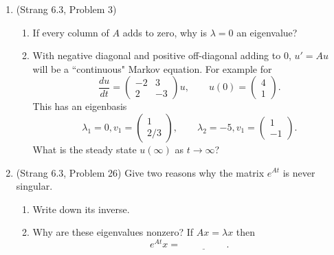 \documentclass[11pt]{article}
\begin{document}
\begin{enumerate}
\item (Strang 6.3, Problem 3)
\begin{enumerate}
\item If every column of $A$ adds to zero, why is $\lambda = 0$ an eigenvalue?
\item With negative diagonal and positive off-diagonal adding to $0$, $u' = Au$ will be a ``continuous" Markov equation.  For example for
\[\frac{du}{dt} = \begin{pmatrix} -2 & 3 \\ 2 & -3 \end{pmatrix} u, \qquad u(0) = \begin{pmatrix} 4 \\ 1 \end{pmatrix}.\]
This has an eigenbasis
\[\lambda_1 = 0, v_1 = \begin{pmatrix} 1 \\ 2/3 \end{pmatrix}, \qquad \lambda_2 = -5, v_1 = \begin{pmatrix} 1 \\ -1 \end{pmatrix}.\]
What is the steady state $u(\infty)$ as $t \to \infty$?
\end{enumerate}

\item (Strang 6.3, Problem 26) Give two reasons why the matrix $e^{At}$ is never singular.
\begin{enumerate}
\item Write down its inverse.
\item Why are these eigenvalues nonzero?  If $Ax = \lambda x$ then 
\[e^{At} x = \underline{\phantom{aaaaaaaaa}}. \]
\end{enumerate}

\end{enumerate}
\end{document}

